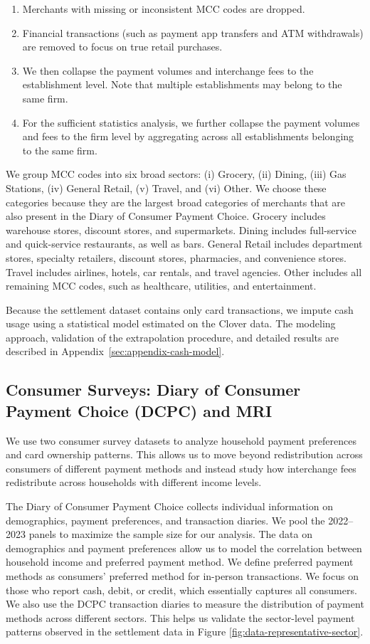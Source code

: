 \documentclass[11pt,english]{article}
\theoremstyle{remark}
\begin{document}
\begin{enumerate}
    \item Merchants with missing or inconsistent MCC codes are dropped.
    \item Financial transactions (such as payment app transfers and ATM withdrawals) are removed to focus on true retail purchases.
    \item We then collapse the payment volumes and interchange fees to the establishment level. Note that multiple establishments may belong to the same firm.
    \item For the sufficient statistics analysis, we further collapse the payment volumes and fees to the firm level by aggregating across all establishments belonging to the same firm.
\end{enumerate}

We group MCC codes into six broad sectors: (i) Grocery, (ii) Dining, (iii) Gas Stations, (iv) General Retail, (v) Travel, and (vi) Other.
We choose these categories because they are the largest broad categories of merchants that are also present in the Diary of Consumer Payment Choice.
Grocery includes warehouse stores, discount stores, and supermarkets.
Dining includes full-service and quick-service restaurants, as well as bars.
General Retail includes department stores, specialty retailers, discount stores, pharmacies, and convenience stores.
Travel includes airlines, hotels, car rentals, and travel agencies.
Other includes all remaining MCC codes, such as healthcare, utilities, and entertainment.

Because the settlement dataset contains only card transactions, we impute cash usage using a statistical model estimated on the Clover data.
The modeling approach, validation of the extrapolation procedure, and detailed results are described in Appendix~\ref{sec:appendix-cash-model}.

\subsection{Consumer Surveys: Diary of Consumer Payment Choice (DCPC) and MRI}

We use two consumer survey datasets to analyze household payment preferences and card ownership patterns.
This allows us to move beyond redistribution across consumers of different payment methods and instead study how interchange fees redistribute across households with different income levels.

The Diary of Consumer Payment Choice collects individual information on demographics, payment preferences, and transaction diaries.
We pool the 2022--2023 panels to maximize the sample size for our analysis.
The data on demographics and payment preferences allow us to model the correlation between household income and preferred payment method.
We define preferred payment methods as consumers' preferred method for in-person transactions.
We focus on those who report cash, debit, or credit, which essentially captures all consumers.
We also use the DCPC transaction diaries to measure the distribution of payment methods across different sectors.
This helps us validate the sector-level payment patterns observed in the settlement data in Figure \ref{fig:data-representative-sector}.
\end{document}
